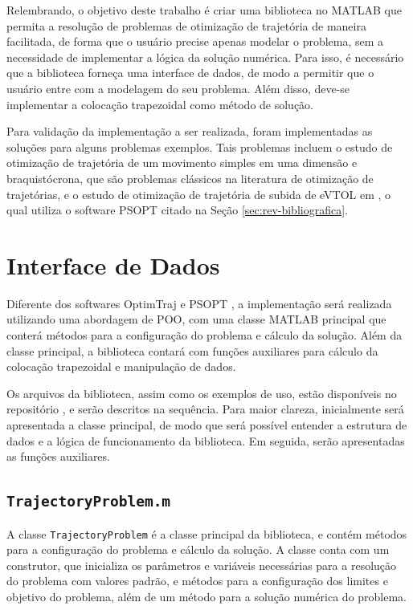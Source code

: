 
Relembrando, o objetivo deste trabalho é criar uma biblioteca no MATLAB que permita a resolução de problemas de otimização de trajetória de maneira facilitada, de forma que o usuário precise apenas modelar o problema, sem a necessidade de implementar a lógica da solução numérica. Para isso, é necessário que a biblioteca forneça uma interface de dados, de modo a permitir que o usuário entre com a modelagem do seu problema. Além disso, deve-se implementar a colocação trapezoidal como método de solução.

Para validação da implementação a ser realizada, foram implementadas as soluções para alguns problemas exemplos. Tais problemas incluem o estudo de otimização de trajetória de um movimento simples em uma dimensão e braquistócrona, que são problemas clássicos na literatura de otimização de trajetórias, e o estudo de otimização de trajetória de subida de eVTOL em \cite{costa_otimizacao_2023}, o qual utiliza o software PSOPT citado na Seção \ref{sec:rev-bibliografica}.

\section{Interface de Dados}
\label{sec:interface-dados}

Diferente dos softwares OptimTraj \cite{kelly_optimtraj_2022} e PSOPT \cite{becerra_psopt_2022}, a implementação será realizada utilizando uma abordagem de POO, com uma classe MATLAB principal que conterá métodos para a configuração do problema e cálculo da solução. Além da classe principal, a biblioteca contará com funções auxiliares para cálculo da colocação trapezoidal e manipulação de dados.

Os arquivos da biblioteca, assim como os exemplos de uso, estão disponíveis no repositório \cite{simplicio_hsimpliciotg-ita_2024}, e serão descritos na sequência. Para maior clareza, inicialmente será apresentada a classe principal, de modo que será possível entender a estrutura de dados e a lógica de funcionamento da biblioteca. Em seguida, serão apresentadas as funções auxiliares.

\subsection{\texttt{TrajectoryProblem.m}}
\label{subsec:classe-trajectoryproblem}

A classe \texttt{TrajectoryProblem} é a classe principal da biblioteca, e contém métodos para a configuração do problema e cálculo da solução. A classe conta com um construtor, que inicializa os parâmetros e variáveis necessárias para a resolução do problema com valores padrão, e métodos para a configuração dos limites e objetivo do problema, além de um método para a solução numérica do problema.


